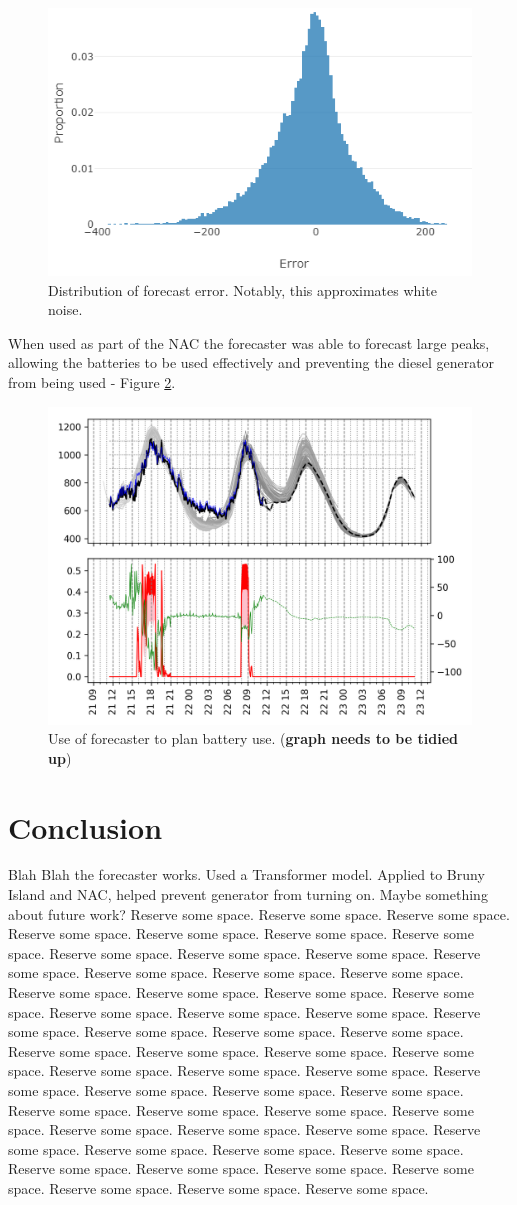 \documentclass[conference]{IEEEtran}
\begin{document}
\begin{figure}[htbp]
	\centerline{\includegraphics[width=.35\textwidth]{images/errors_histogram.png}}
	\caption{Distribution of forecast error.
		     Notably, this approximates white noise.}
	\label{fig:bruny_hist}
\end{figure}

When used as part of the NAC the forecaster was able to forecast large peaks, allowing the batteries to be used effectively and preventing the diesel generator from being used - Figure \ref{fig:bruny_nac}.

\begin{figure}[htbp]
	\centerline{\includegraphics[width=.35\textwidth]{images/bruny_nac.png}}
	\caption{Use of forecaster to plan battery use.
		(\textbf{graph needs to be tidied up})}
	\label{fig:bruny_nac}
\end{figure}


\section{Conclusion}
Blah Blah the forecaster works.
Used a Transformer model.
Applied to Bruny Island and NAC, helped prevent generator from turning on.
Maybe something about future work?
Reserve some space. Reserve some space. Reserve some space.
Reserve some space. Reserve some space. Reserve some space.
Reserve some space. Reserve some space. Reserve some space.
Reserve some space. Reserve some space. Reserve some space.
Reserve some space. Reserve some space. Reserve some space.
Reserve some space. Reserve some space. Reserve some space.
Reserve some space. Reserve some space. Reserve some space.
Reserve some space. Reserve some space. Reserve some space.
Reserve some space. Reserve some space. Reserve some space.
Reserve some space. Reserve some space. Reserve some space.
Reserve some space. Reserve some space. Reserve some space.
Reserve some space. Reserve some space. Reserve some space.
Reserve some space. Reserve some space. Reserve some space.
Reserve some space. Reserve some space. Reserve some space.
Reserve some space. Reserve some space. Reserve some space.
Reserve some space. Reserve some space. Reserve some space.
Reserve some space. Reserve some space. Reserve some space.
Reserve some space. Reserve some space. Reserve some space.
\end{document}
